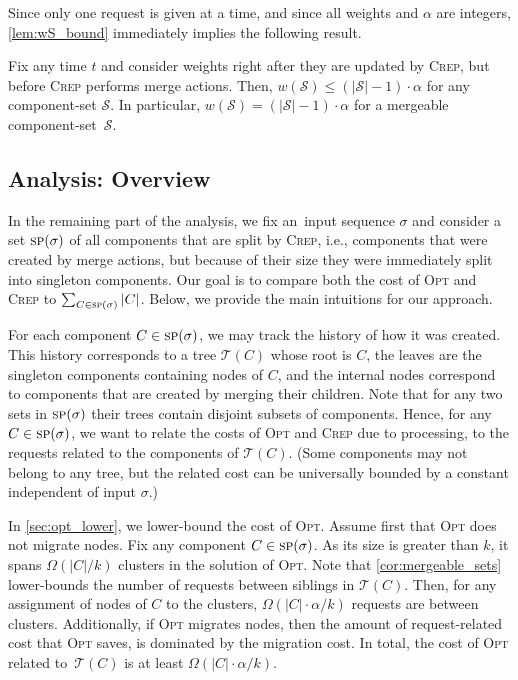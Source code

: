 \documentclass{siamart190516}
\newcommand{\OPT}{\textsc{Opt}\xspace}
\newcommand{\CREP}{\textsc{Crep}\xspace}
\newcommand{\T}{\mathcal{T}}
\newcommand{\spl}{\textsc{sp}}
\newcommand{\set}{\mathcal{S}}
\begin{document}
Since only one request is given at a time, and since all weights and $\alpha$
are integers, \cref{lem:wS_bound} immediately implies the following
result.

\begin{corollary}
\label{cor:mergeable_sets} Fix any time $t$ and consider weights right after
they are updated by \CREP, but before \CREP performs merge actions. Then,
$w(\set) \leq (|\set|-1) \cdot \alpha$ for any component-set $\set$. In particular,
$w(\set) = (|\set|-1) \cdot \alpha$ for a mergeable component-set~$\set$.
\end{corollary}


\subsection{Analysis: Overview}

In the remaining part of the analysis, we fix an~input sequence $\sigma$ and
consider a set $\spl(\sigma)$ of all components that are split by \CREP, i.e.,
components that were created by merge actions, but because of their size they
were immediately split into singleton components. Our goal is to compare both
the cost of \OPT and \CREP to $\sum_{C \in \spl(\sigma)} |C|$. 
Below, we provide the main intuitions for our approach.

For each component $C \in \spl(\sigma)$, we may track the history of how it was
created. This history corresponds to a tree $\T(C)$ whose root is $C$, the leaves are the singleton components containing nodes of $C$, and the internal nodes correspond
to components that are created by merging their children. Note that for any
two sets in $\spl(\sigma)$ their trees contain disjoint subsets of components.
Hence, for any $C \in \spl(\sigma)$, we want to relate the costs of \OPT and
\CREP due to processing, 
to the requests related to the components of $\T(C)$. (Some
components may not belong to any tree, but the related cost can be universally
bounded by a constant independent of input $\sigma$.)

In \cref{sec:opt_lower}, we lower-bound the cost of \OPT. Assume first that \OPT
does not migrate nodes. Fix any component $C \in \spl(\sigma)$. As its size is
greater than $k$, it spans $\Omega(|C|/k)$ clusters in the solution of \OPT. Note
that \cref{cor:mergeable_sets} lower-bounds the number of requests between
siblings in $\T(C)$. Then, for any assignment of nodes of $C$ to 
the clusters, $\Omega(|C| \cdot \alpha /k)$ requests are between clusters.
Additionally, if \OPT migrates nodes, then the amount of
request-related cost that \OPT saves, is dominated by the migration cost. In total,
the cost of \OPT related to~$\T(C)$ is at least $\Omega(|C| \cdot
\alpha / k)$.
\end{document}
